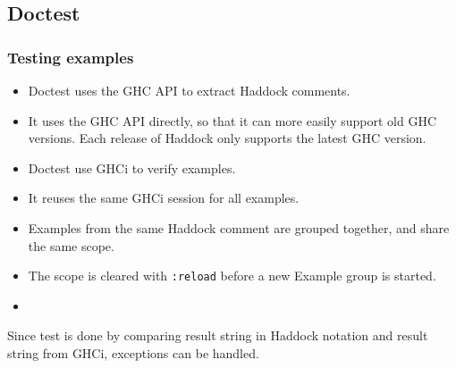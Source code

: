 \documentclass[preprint]{sigplanconf}
\begin{document}



\subsection{Doctest}
\label{sec:doctest}

\subsubsection{Testing examples}

\begin{itemize}
    \item
        Doctest uses the GHC API to extract Haddock comments.
    \item
        It uses the GHC API directly, so that it can more easily
        support old GHC versions.  Each release of Haddock only
        supports the latest GHC version.
    \item
        Doctest use GHCi to verify examples.
    \item
        It reuses the same GHCi session for all examples.
    \item
        Examples from the same Haddock comment are grouped together,
        and share the same scope.
    \item
        The scope is cleared with \verb|:reload| before a new
        Example group is started.
    \item
\end{itemize}

Since test is done by comparing result string in Haddock notation and
result string from GHCi, exceptions can be handled.
\end{document}
